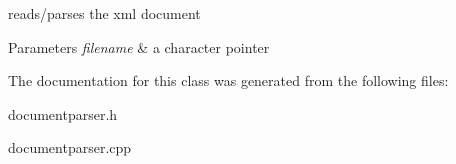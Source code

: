 reads/parses the xml document 


\begin{DoxyParams}{Parameters}
{\em filename} & a character pointer \\
\hline
\end{DoxyParams}


The documentation for this class was generated from the following files\-:\begin{DoxyCompactItemize}
\item 
documentparser.\-h\item 
documentparser.\-cpp\end{DoxyCompactItemize}
